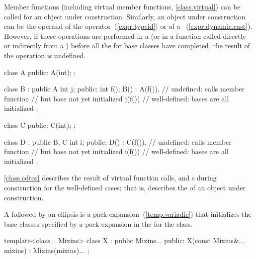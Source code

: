 \pnum
{}%
Member functions (including virtual member functions, \ref{class.virtual}) can be
called for an object under construction.
Similarly, an object under construction can be the operand of the
operator~(\ref{expr.typeid}) or of a
~(\ref{expr.dynamic.cast}).
However, if these operations are performed in a
(or in a function called directly or indirectly from a
)
before all the
for base classes have completed, the result of the operation is undefined.
\begin{example}

\begin{codeblock}
class A {
public:
  A(int);
};

class B : public A {
  int j;
public:
  int f();
  B() : A(f()),     // undefined: calls member function
                    // but base  not yet initialized
  j(f()) { }        // well-defined: bases are all initialized
};

class C {
public:
  C(int);
};

class D : public B, C {
  int i;
public:
  D() : C(f()),     // undefined: calls member function
                    // but base  not yet initialized
  i(f()) { }        // well-defined: bases are all initialized
};
\end{codeblock}
\end{example}

\pnum
\begin{note}
\ref{class.cdtor} describes the result of virtual function calls,
and
s
during construction for the well-defined cases;
that is, describes the
of an object under construction.
\end{note}

\pnum
{}%
A  followed by an ellipsis is
a pack expansion~(\ref{temp.variadic}) that initializes the base
classes specified by a pack expansion in the 
for the class. \begin{example}

\begin{codeblock}
template<class... Mixins>
class X : public Mixins... {
public:
  X(const Mixins&... mixins) : Mixins(mixins)... { }
};
\end{codeblock}

\end{example}%

